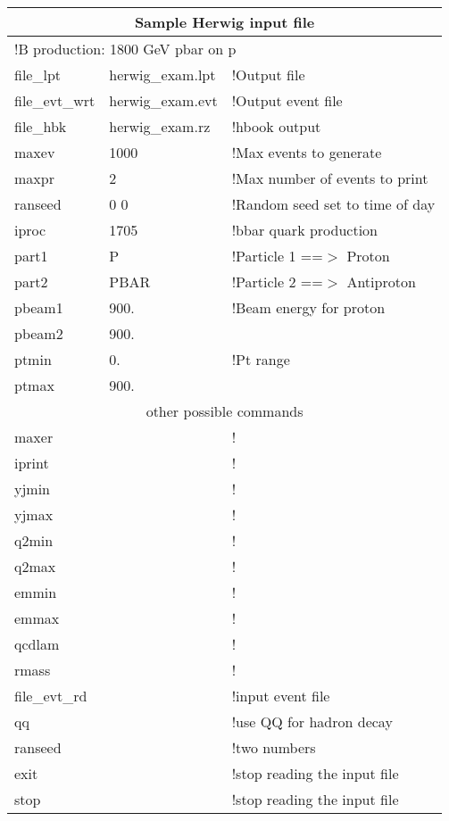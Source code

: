 \begin{tabular}{|lll|} \hline
\multicolumn{3}{|c|}{Sample Herwig input file} \\  \hline
\multicolumn{3}{|l|}{!B production: 1800 GeV pbar on p} \\
file\_lpt & herwig\_exam.lpt &  !Output file \\
file\_evt\_wrt & herwig\_exam.evt &  !Output event file \\
file\_hbk & herwig\_exam.rz &  !hbook output \\
maxev & 1000      &          !Max events to generate \\
maxpr & 2        &           !Max number of events to print \\
ranseed & 0 0    &           !Random seed set to time of day \\
iproc & 1705    &            !bbar quark production \\
part1 & P      &             !Particle 1 ==$>$ Proton \\
part2 & PBAR   &             !Particle 2 ==$>$ Antiproton \\
pbeam1 & 900.    &           !Beam energy for proton \\
pbeam2 & 900. &   \\
ptmin & 0.        &          !Pt range \\
ptmax & 900. &  \\ \hline
\multicolumn{3}{|c|}{other possible commands} \\  \hline
maxer        &                 & ! \\
iprint       &                 & ! \\
yjmin        &                 & ! \\
yjmax        &                 & ! \\
q2min        &                 & ! \\
q2max        &                 & ! \\
emmin        &                 & ! \\
emmax        &                 & ! \\
qcdlam       &                 & ! \\
rmass        &                 & ! \\
file\_evt\_rd  &               & !input event file \\
qq           &                 & !use QQ for hadron decay \\
ranseed      &                 & !two numbers \\
exit         &                 & !stop reading the input file  \\
stop         &                 & !stop reading the input file  \\ \hline
\end{tabular}

